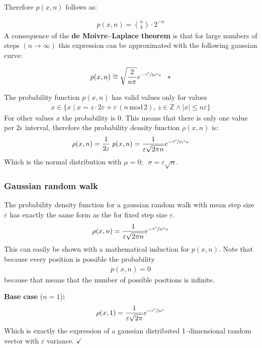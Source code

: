 \documentclass[a4paper, parskip=half]{scrartcl}
\newcommand{\effect}[1]{%
	\textbf{#1}%
}
\newcommand{\myEqLabel}[1]{\label{eq:#1}}
\newcommand{\myEqAnnex}[1]{\;\;\;\ast \myEqLabel{#1}}
\begin{document}
Therefore $p(x,n)$ follows as:

\begin{align}
p(x,n) = \binom{n}{k} \cdot 2^{-n}
\end{align}
A consequence of the \effect{de Moivre–Laplace theorem} is that for large numbers of steps $(n\rightarrow\infty)$ this expression can be approximated with the following gaussian curve:

\begin{align}
p(x,n) \cong \sqrt{\frac{2}{n \pi}} e^{-\sfrac{x^2}{2\varepsilon^2 n}} \myEqAnnex{moivre_laplace_theorem}
\end{align}

The probability function $p(x,n)$ has valid values only for values 
\begin{align}
x \in \{x\; |\; x = z \cdot 2 \varepsilon + \varepsilon\, (n\,\mathrm{mod}\, 2),\, z \in \mathbb{Z} \wedge |x| \leq n \varepsilon\} 
\end{align}
For other values $x$ the probability is $0$. This means that there is only one value per $2\epsilon$ interval, therefore the probability density function $\rho(x,n)$ is:
\begin{align}
\rho(x,n) = \frac{1}{2\varepsilon}\; p(x,n) = \frac{1}{\varepsilon\sqrt{2\pi n}} e^{-\sfrac{x^2}{2\varepsilon^2 n}}
\end{align}
Which is the normal distribution with $\mu = 0;\;\; \sigma =  \varepsilon\sqrt{n}$.

\subsubsection{Gaussian random walk}
The probability density function for a gaussian random walk with mean step size $\varepsilon$ has exactly the same form as the for fixed step size $\varepsilon$.
\begin{align}
\rho(x,n) = \frac{1}{\varepsilon\sqrt{2\pi n}} e^{-\sfrac{x^2}{2\varepsilon^2 n}} \myEqLabel{rho_gauss}
\end{align}
This can easily be shown with a mathematical induction for $p(x,n)$. Note that because every position is possible the probability 
\begin{align}
p(x,n) = 0 
\end{align}
because that means that the number of possible positions is infinite.

\textbf{Base case} ($n = 1$)\textbf{:}
\begin{align}
\rho(x,1) = \frac{1}{\varepsilon\sqrt{2\pi}} e^{-\sfrac{x^2}{2\varepsilon^2}}
\end{align}
Which is exactly the expression of a gaussian distributed 1--dimensional random vector with $\varepsilon$ variance. $\checkmark$
\end{document}
